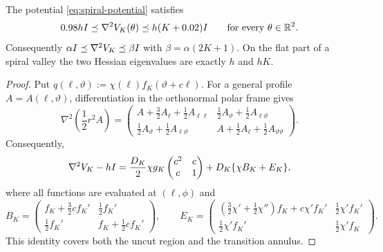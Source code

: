 \begin{lemma}\label{lem:spiral-hessian}
    The potential \eqref{eq:spiral-potential} satisfies
    \begin{equation}\label{eq:spiral-Hessian-bounds}
        0.98hI\preceq\nabla^2V_K(\theta)\preceq h(K+0.02)I
        \qquad\text{for every }\theta\in\mathbb{R}^2 .
    \end{equation}
    Consequently $\alpha I\preceq\nabla^2V_K\preceq\beta I$ with $\beta=\alpha(2K+1)$. On the
    flat part of a spiral valley the two Hessian eigenvalues are exactly $h$ and $hK$.
\end{lemma}

\begin{proof}
    Put $q(\ell,\vartheta):=\chi(\ell)f_K(\vartheta+c\ell)$. For a general profile
    $A=A(\ell,\vartheta)$, differentiation in the orthonormal polar frame gives
    \begin{equation*}
        \nabla^2\left(\frac12r^2A\right)
        =
        \begin{pmatrix}
            A+\frac32A_\ell+\frac12A_{\ell\ell}
            &\frac12A_\vartheta+\frac12A_{\ell\vartheta}\\[1mm]
            \frac12A_\vartheta+\frac12A_{\ell\vartheta}
            &A+\frac12A_\ell+\frac12A_{\vartheta\vartheta}
        \end{pmatrix}.
    \end{equation*}
    Consequently,
    \begin{equation}\label{eq:spiral-Hessian-decomposition}
        \nabla^2V_K-hI
        =\frac{D_K}2\chi g_K\begin{pmatrix}c^2&c\\c&1\end{pmatrix}
        +D_K\{\chi B_K+E_K\},
    \end{equation}
    where all functions are evaluated at $(\ell,\phi)$ and
    \begin{equation*}
        B_K=
        \begin{pmatrix}
            f_K+\frac32cf_K'&\frac12f_K'\\
            \frac12f_K'&f_K+\frac12cf_K'
        \end{pmatrix},
        \qquad
        E_K=
        \begin{pmatrix}
            (\frac32\chi'+\frac12\chi'')f_K+c\chi'f_K'&\frac12\chi'f_K'\\
            \frac12\chi'f_K'&\frac12\chi'f_K
        \end{pmatrix}.
    \end{equation*}
    This identity covers both the uncut region and the transition annulus.


\end{proof}
